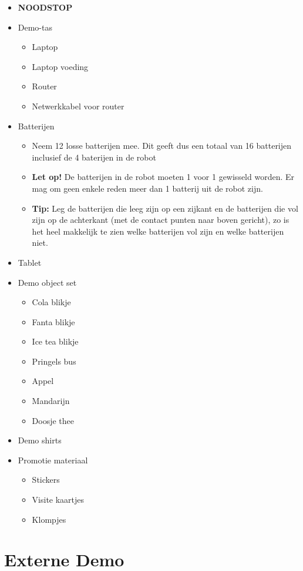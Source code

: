 \documentclass[a4paper,10pt]{article}
\numberwithin{equation}{section}
\numberwithin{figure}{section}
\numberwithin{table}{section}
\begin{document}
\begin{itemize}
	\item \textbf{NOODSTOP}
	\item Demo-tas
	\begin{itemize}
		\item Laptop
		\item Laptop voeding
		\item Router
		\item Netwerkkabel voor router
	\end{itemize}
	\item Batterijen
	\begin{itemize}
		\item Neem 12 losse batterijen mee. Dit geeft dus een totaal van 16 batterijen inclusief de 4 baterijen in de robot
		\item \textbf{Let op!} De batterijen in de robot moeten 1 voor 1 gewisseld worden. Er mag om geen enkele reden meer dan 1 batterij uit de robot zijn.
		\item \textbf{Tip:} Leg de batterijen die leeg zijn op een zijkant  en de batterijen die vol zijn op de achterkant (met de contact punten naar boven gericht), zo is het heel makkelijk te zien welke batterijen vol zijn en welke batterijen niet.
	\end{itemize} 
	\item Tablet
	    \item Demo object set
	    \begin{itemize}
	    	\item Cola blikje 
	    	\item Fanta blikje
	    	\item Ice tea blikje
	    	\item Pringels bus
	    	\item Appel
	    	\item Mandarijn
	    	\item Doosje thee
	    \end{itemize}
	\item Demo shirts
	\item Promotie materiaal
		\begin{itemize}
			\item Stickers
			\item Visite kaartjes
			\item Klompjes
		\end{itemize}
\end{itemize}

\section{Externe Demo}
\end{document}

